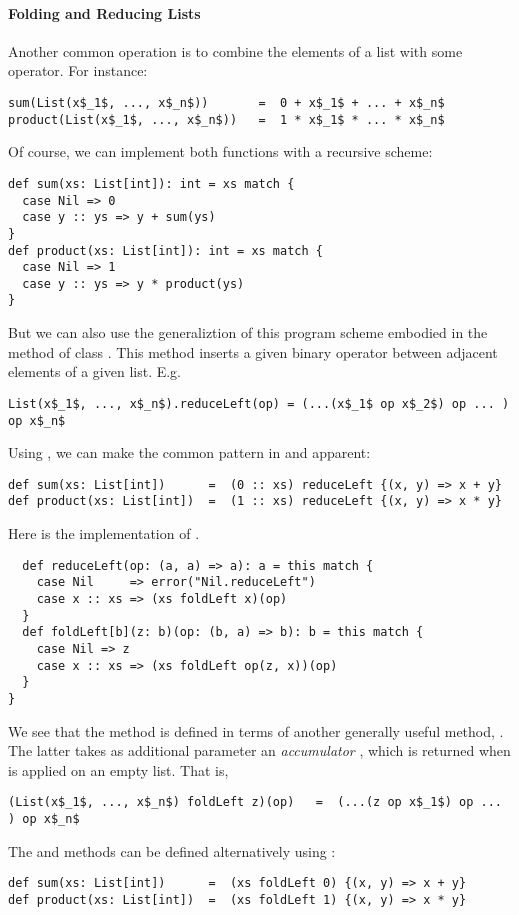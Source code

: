\paragraph{Folding and Reducing Lists}
Another common operation is to combine the elements of a list with
some operator.  For instance:
\begin{lstlisting}
sum(List(x$_1$, ..., x$_n$))       =  0 + x$_1$ + ... + x$_n$
product(List(x$_1$, ..., x$_n$))   =  1 * x$_1$ * ... * x$_n$
\end{lstlisting}
Of course, we can implement both functions with a
recursive scheme:
\begin{lstlisting}
def sum(xs: List[int]): int = xs match {
  case Nil => 0
  case y :: ys => y + sum(ys)
}
def product(xs: List[int]): int = xs match {
  case Nil => 1
  case y :: ys => y * product(ys)
}
\end{lstlisting}
But we can also use the generaliztion of this program scheme embodied
in the  method of class .  This method
inserts a given binary operator between adjacent elements of a given list.
E.g.\ 
\begin{lstlisting}
List(x$_1$, ..., x$_n$).reduceLeft(op) = (...(x$_1$ op x$_2$) op ... ) op x$_n$
\end{lstlisting}
Using , we can make the common pattern
in  and  apparent:
\begin{lstlisting}
def sum(xs: List[int])      =  (0 :: xs) reduceLeft {(x, y) => x + y}
def product(xs: List[int])  =  (1 :: xs) reduceLeft {(x, y) => x * y}
\end{lstlisting}
Here is the implementation of .
\begin{lstlisting}
  def reduceLeft(op: (a, a) => a): a = this match {
    case Nil     => error("Nil.reduceLeft")
    case x :: xs => (xs foldLeft x)(op)
  }
  def foldLeft[b](z: b)(op: (b, a) => b): b = this match {
    case Nil => z
    case x :: xs => (xs foldLeft op(z, x))(op)
  }
}
\end{lstlisting}
We see that the  method is defined in terms of
another generally useful method, .  The latter takes as
additional parameter an {\em accumulator} \code{z}, which is returned
when \code{foldLeft} is applied on an empty list. That is,
\begin{lstlisting}
(List(x$_1$, ..., x$_n$) foldLeft z)(op)   =  (...(z op x$_1$) op ... ) op x$_n$
\end{lstlisting}
The  and  methods can be defined alternatively
using \code{foldLeft}:
\begin{lstlisting}
def sum(xs: List[int])      =  (xs foldLeft 0) {(x, y) => x + y}
def product(xs: List[int])  =  (xs foldLeft 1) {(x, y) => x * y}
\end{lstlisting}

